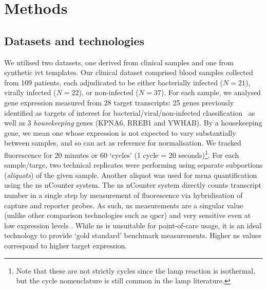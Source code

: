 \documentclass[../thesis.tex]{subfiles}
\begin{document}
\section{Methods}
\subsection{Datasets and technologies \label{sec:data}}
We utilised two datasets, one derived from clinical samples and one from synthetic \gls{ivt}  templates. Our clinical dataset comprised blood samples collected from 109 patients, each adjudicated to be either bacterially infected ($N=21$), virally infected ($N=22$), or non-infected ($N=37$). For each sample, we analysed gene expression measured from 28 target  transcripts: 25 genes previously identified as targets of interest for bacterial/viral/non-infected classification~\citep{he_optimization_2021} as well as 3 \emph{housekeeping} genes (KPNA6, RREB1 and YWHAB). By a housekeeping gene, we mean one whose expression is not expected to vary substantially between samples, and so can act as reference for normalisation. We tracked fluorescence for 20 minutes or 60 `cycles' (1 cycle = 20 seconds)\footnote{Note that these are not strictly cycles since the \gls{lamp} reaction is isothermal, but the cycle nomenclature is still common in the \gls{lamp} literature.}. For each sample/targe, two technical replicates were performing using separate subportions (\emph{aliquots}) of the given sample. Another aliquot was used for \gls{mrna} quantification using the \gls{ns} nCounter system. The \gls{ns} nCounter system  directly counts transcript number in a single step by measurement of fluorescence via hybridisation of capture and reporter probes. As such, \gls{ns} measurements are a singular value (unlike other comparison technologies such as \gls{qpcr}) and very sensitive even at low expression levels \citep{geiss_direct_2008}. While \gls{ns} is unsuitable for point-of-care usage, it is an ideal technology to provide `gold standard' benchmark measurements. Higher \gls{ns} values correspond to higher target expression. 
\end{document}
